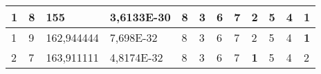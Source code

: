 \documentclass[conference]{IEEEtran}
\begin{document}
\begin{table*}[]
\begin{tabular}{|llll|llllllll|}
\multicolumn{1}{|l|}{1}                                                     & \multicolumn{1}{l|}{8}                                                        & \multicolumn{1}{l|}{155}                                                          & 3,6133E-30                     & \multicolumn{1}{l|}{8}                                                  & \multicolumn{1}{l|}{3}                                                  & \multicolumn{1}{l|}{6}                                                  & \multicolumn{1}{l|}{7}                                                  & \multicolumn{1}{l|}{2}                                                  & \multicolumn{1}{l|}{5}                                                  & \multicolumn{1}{l|}{4}                                                  & \textbf{1}                 \\ \hline
\multicolumn{1}{|l|}{1}                                                     & \multicolumn{1}{l|}{9}                                                        & \multicolumn{1}{l|}{162,944444}                                                   & 7,698E-32                      & \multicolumn{1}{l|}{8}                                                  & \multicolumn{1}{l|}{3}                                                  & \multicolumn{1}{l|}{6}                                                  & \multicolumn{1}{l|}{7}                                                  & \multicolumn{1}{l|}{2}                                                  & \multicolumn{1}{l|}{5}                                                  & \multicolumn{1}{l|}{4}                                                  & \textbf{1}                 \\ \hline
\multicolumn{1}{|l|}{2}                                                     & \multicolumn{1}{l|}{7}                                                        & \multicolumn{1}{l|}{163,911111}                                                   & 4,8174E-32                     & \multicolumn{1}{l|}{8}                                                  & \multicolumn{1}{l|}{3}                                                  & \multicolumn{1}{l|}{6}                                                  & \multicolumn{1}{l|}{7}                                                  & \multicolumn{1}{l|}{\textbf{1}}                                         & \multicolumn{1}{l|}{5}                                                  & \multicolumn{1}{l|}{4}                                                  & 2                          \\ \hline

\end{tabular}
\end{table*}
\end{document}
